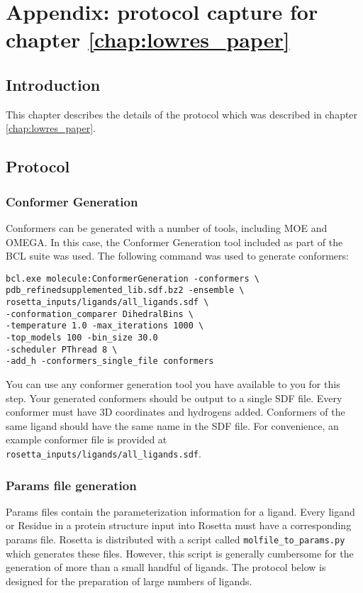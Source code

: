 \chapter{Appendix: protocol capture for chapter \ref{chap:lowres_paper}}
\label{chap:lowres_capture}
\section{Introduction}

This chapter describes the details of the protocol which was described in chapter \ref{chap:lowres_paper}.

\section{Protocol}

\subsection{Conformer Generation}

Conformers can be generated with a number of tools, including MOE and OMEGA.
In this case, the Conformer Generation tool included as part of the \ac{BCL} suite was used.
The following command was used to generate conformers:
\singlespace
\begin{verbatim}
bcl.exe molecule:ConformerGeneration -conformers \
pdb_refinedsupplemented_lib.sdf.bz2 -ensemble \
rosetta_inputs/ligands/all_ligands.sdf \
-conformation_comparer DihedralBins \
-temperature 1.0 -max_iterations 1000 \
-top_models 100 -bin_size 30.0 
-scheduler PThread 8 \
-add_h -conformers_single_file conformers
\end{verbatim}
\doublespace
You can use any conformer generation tool you have available to you for this step.
Your generated conformers should be output to a single \ac{SDF} file.
Every conformer must have 3D coordinates and hydrogens added.
Conformers of the same ligand should have the same name in the \ac{SDF} file.
For convenience, an example conformer file is provided at \texttt{rosetta\_inputs/ligands/all\_ligands.sdf}.

\subsection{Params file generation}

Params files contain the parameterization information for a ligand.
Every  ligand or Residue in a protein structure input into Rosetta must have a corresponding params file.
Rosetta is distributed with a script called \texttt{molfile\_to\_params.py} which generates these files.
However, this script is generally cumbersome for the generation of more than a small handful of ligands.
The protocol below is designed for the preparation of large numbers of ligands.

